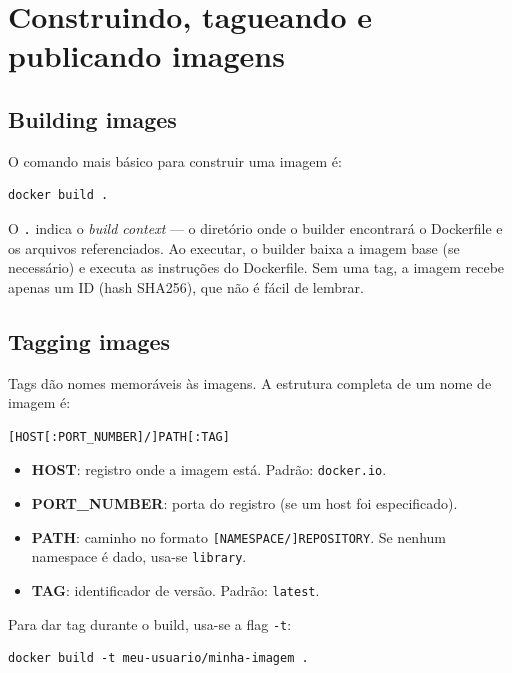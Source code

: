 \section{Construindo, tagueando e publicando imagens}

\subsection{Building images}

O comando mais básico para construir uma imagem é:

\begin{verbatim}
docker build .
\end{verbatim}

O \texttt{.} indica o \textit{build context} --- o diretório onde o builder encontrará o Dockerfile e os arquivos referenciados. Ao executar, o builder baixa a imagem base (se necessário) e executa as instruções do Dockerfile. Sem uma tag, a imagem recebe apenas um ID (hash SHA256), que não é fácil de lembrar.

\subsection{Tagging images}

Tags dão nomes memoráveis às imagens. A estrutura completa de um nome de imagem é:

\begin{verbatim}
[HOST[:PORT_NUMBER]/]PATH[:TAG]
\end{verbatim}

\begin{itemize}
    \item \textbf{HOST}: registro onde a imagem está. Padrão: \texttt{docker.io}.
    \item \textbf{PORT\_NUMBER}: porta do registro (se um host foi especificado).
    \item \textbf{PATH}: caminho no formato \texttt{[NAMESPACE/]REPOSITORY}. Se nenhum namespace é dado, usa-se \texttt{library}.
    \item \textbf{TAG}: identificador de versão. Padrão: \texttt{latest}.
\end{itemize}

Para dar tag durante o build, usa-se a flag \texttt{-t}:

\begin{verbatim}
docker build -t meu-usuario/minha-imagem .
\end{verbatim}

